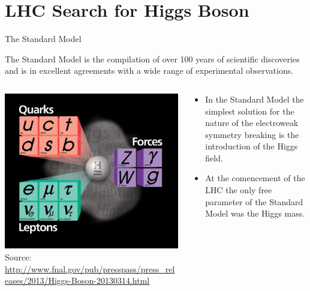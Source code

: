 \section{LHC Search for Higgs Boson}


\begin{frame}{The Standard Model}
\begin{center}
The Standard Model is the compilation of over 100 years of scientific discoveries and is in excellent agreements with a wide range of experimental observations.
\\
\vspace{1em}
\begin{columns}
  \begin{column}{0.5\textwidth}
    \begin{center}
    \includegraphics[width=.95\textwidth]{images/standard_model_particles.jpg}\vspace{.1em}
    {\fontsize{.1cm}{.001em}\selectfont Source: \url{http://www.fnal.gov/pub/presspass/press_releases/2013/Higgs-Boson-20130314.html}}
    \end{center}
  \end{column}
  \begin{column}{0.5\textwidth}
\begin{center}
\begin{itemize}
  \item
In the Standard Model the simplest solution for the nature of the electroweak symmetry breaking is the introduction of the Higgs field.
\item 
At the comencement of the LHC the only free parameter of the Standard Model was the Higgs mass.
\end{itemize}
\end{center}
  \end{column}
\end{columns}
\end{center}
\end{frame}

